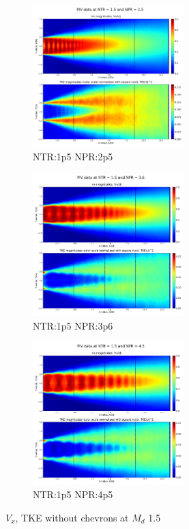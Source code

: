 \begin{figure}[H]
\begin{subfigure}{.5\textwidth}
	\centering
	\includegraphics[width=2.3in]{images/PIV_NTR1p5_NPR2p5.png}
	\caption{NTR:1p5 NPR:2p5 }
	\label{fig:2dplots1p52p5}
\end{subfigure}%
\begin{subfigure}{.5\textwidth}
	\centering
	\includegraphics[width=2.3in]{images/PIV_NTR1p5_NPR3p6.png}
	\caption{NTR:1p5 NPR:3p6 }
	\label{fig:2dplots1p53p6}
\end{subfigure}
\begin{subfigure}{1.0\textwidth}
	\centering
	\includegraphics[width=2.3in]{images/PIV_NTR1p5_NPR4p5.png}
	\caption{NTR:1p5 NPR:4p5 }
	\label{fig:2dplots1p544p5}
\end{subfigure}
\caption{$V_x$, TKE without chevrons at $M_d$ 1.5 }
\label{fig:2dplots}
\end{figure}

